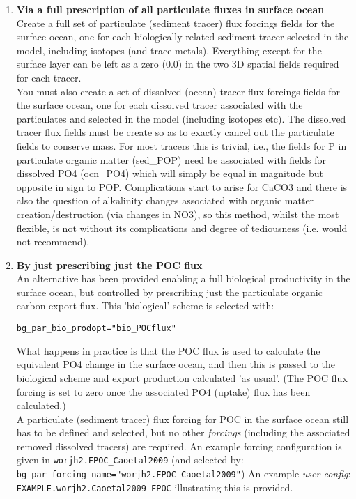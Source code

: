 \documentclass[11pt,fleqn]{book} %
\begin{document}
\begin{enumerate}[noitemsep]

\vspace{1mm}
        \item \textbf{Via a full prescription of all particulate fluxes in surface ocean}
                \\Create a full set of particulate (sediment tracer) flux forcings fields for the surface ocean, one for each biologically-related sediment tracer selected in the model, including isotopes (and trace metals). Everything except for the surface layer can be left as a zero (0.0) in the two 3D spatial fields required for each tracer.
        \\You must also create a set of dissolved (ocean) tracer flux forcings fields for the surface ocean, one for each dissolved tracer associated with the particulates and selected in the model (including isotopes etc). The dissolved tracer flux fields must be create so as to exactly cancel out the particulate fields to conserve mass. For most tracers this is trivial, i.e., the fields for P in particulate organic matter (sed\_POP) need be associated with fields for dissolved PO4 (ocn\_PO4) which will simply be equal in magnitude but opposite in sign to POP. Complications start to arise for CaCO3 and there is also the question of alkalinity changes associated with organic matter creation/destruction (via changes in NO3), so this method, whilst the most flexible, is not without its complications and degree of tediousness (i.e. would not recommend).

\vspace{1mm}
        \item \textbf{By just prescribing just the POC flux}
                \\An alternative has been provided enabling a full biological productivity in the surface ocean, but controlled by prescribing just the particulate organic carbon export flux. This 'biological' scheme is selected with:
\vspace{-2.5mm}\begin{verbatim}bg_par_bio_prodopt="bio_POCflux"\end{verbatim}\vspace{-2.5mm}
What happens in practice is that the POC flux is used to calculate the equivalent PO4 change in the surface ocean, and then this is passed to the biological scheme and export production calculated 'as usual'. (The POC flux forcing is set to zero once the associated PO4 (uptake) flux has been calculated.)
                \\A particulate (sediment tracer) flux forcing for POC in the surface ocean still has to be defined and selected, but no other \textit{forcings} (including the associated removed dissolved tracers) are required. An example forcing configuration is given in \texttt{worjh2.FPOC\_Caoetal2009} (and selected by: \texttt{bg\_par\_forcing\_name="worjh2.FPOC\_Caoetal2009"})
An example \textit{user-config}: \texttt{EXAMPLE.worjh2.Caoetal2009\_FPOC} illustrating this is provided.


\end{enumerate}
\end{document}
